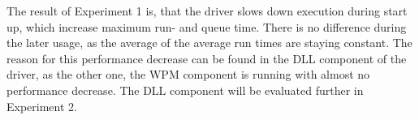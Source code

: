 \medskip

The result of Experiment 1 is, that the driver slows down execution during start up, which increase maximum run- and queue time. There is no difference during the later usage, as the average of the average run times are staying constant. The reason for this performance decrease can be found in the \gls{DLL} component of the driver, as the other one, the \gls{WPM} component is running with almost no performance decrease. The \gls{DLL} component will be evaluated further in Experiment 2.
